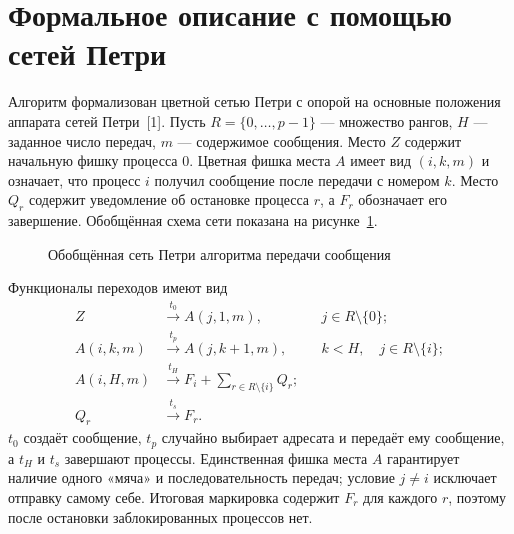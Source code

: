 \documentclass[14pt,a4paper]{extarticle}
\begin{document}
\section{Формальное описание с помощью сетей Петри}

Алгоритм формализован цветной сетью Петри с опорой на основные положения
аппарата сетей Петри~[1]. Пусть $R=\{0,\ldots,p-1\}$ --- множество рангов,
$H$ --- заданное число передач, $m$ --- содержимое сообщения. Место $Z$
содержит начальную фишку процесса 0. Цветная фишка места $A$ имеет вид
$(i,k,m)$ и означает, что процесс $i$ получил сообщение после передачи с
номером $k$. Место $Q_r$ содержит уведомление об остановке процесса $r$, а
$F_r$ обозначает его завершение. Обобщённая схема сети показана на
рисунке~\ref{fig:petri-net}.

\begin{figure}[H]
    \centering
    \caption{Обобщённая сеть Петри алгоритма передачи сообщения}
    \label{fig:petri-net}
\end{figure}

Функционалы переходов имеют вид
\begin{align}
 Z&\xrightarrow{t_0}A(j,1,m),
 &&j\in R\setminus\{0\}; \label{eq:petri-start}\\
 A(i,k,m)&\xrightarrow{t_p}A(j,k+1,m),
 &&k<H,\quad j\in R\setminus\{i\}; \label{eq:petri-pass}\\
 A(i,H,m)&\xrightarrow{t_H}F_i+
 \sum_{r\in R\setminus\{i\}}Q_r; \label{eq:petri-finish}\\
 Q_r&\xrightarrow{t_s}F_r. \label{eq:petri-stop}
\end{align}
$t_0$ создаёт сообщение, $t_p$ случайно выбирает адресата и передаёт ему
сообщение, а $t_H$ и $t_s$ завершают процессы. Единственная фишка места $A$
гарантирует наличие одного «мяча» и последовательность передач; условие
$j\ne i$ исключает отправку самому себе. Итоговая маркировка содержит $F_r$
для каждого $r$, поэтому после остановки заблокированных процессов нет.
\end{document}
